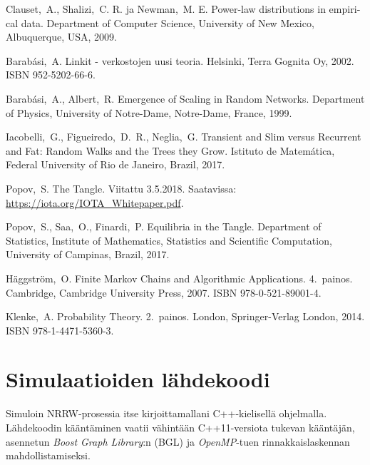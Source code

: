 \documentclass[finnish, 12pt, a4paper, sci, utf8, pdfa]{aaltothesis}
\begin{document}
\thesisbibliography

\begin{thebibliography}{99}

 Clauset,\ A., Shalizi,\ C. R. ja Newman,\ M. E. 
   \foreignlanguage{english}{Power-law distributions in empirical data.} 
   Department of Computer Science, University of New Mexico, Albuquerque, USA, 2009.

 Barabási,\ A. Linkit - verkostojen uusi teoria. 
   Helsinki, Terra Gognita Oy, 2002. ISBN 952-5202-66-6. 

 Barabási,\ A., Albert,\ R.
   \foreignlanguage{english}{Emergence of Scaling in Random Networks.} 
   Department of Physics, University of Notre-Dame, Notre-Dame, France, 1999.

 Iacobelli,\ G., Figueiredo,\ D.\ R., Neglia,\ G. 
   \foreignlanguage{english}{Transient and Slim versus Recurrent and Fat: Random Walks and the Trees they Grow.} 
   Istituto de Matemática, Federal University of Rio de Janeiro, Brazil, 2017.

 Popov,\ S. The Tangle. Viitattu 3.5.2018. Saatavissa: \url{https://iota.org/IOTA_Whitepaper.pdf}.

 Popov,\ S., Saa,\ O., Finardi,\ P. 
   \foreignlanguage{english}{Equilibria in the Tangle.} 
   Department of Statistics, Institute of Mathematics, Statistics and Scientific Computation, University of Campinas, Brazil, 2017.

 Häggström,\ O.
   \foreignlanguage{english}{Finite Markov Chains and Algorithmic Applications.} 
   4.\ painos. Cambridge, Cambridge University Press, 2007. ISBN 978-0-521-89001-4.

 Klenke,\ A.
   \foreignlanguage{english}{Probability Theory.}
   2.\ painos. London, Springer-Verlag London, 2014. ISBN 978-1-4471-5360-3.

\end{thebibliography}

\clearpage

\thesisappendix

\section{Simulaatioiden lähdekoodi\label{LiiteA}}

Simuloin NRRW-prosessia itse kirjoittamallani C++-kielisellä ohjelmalla. Lähdekoodin kääntäminen vaatii vähintään C++11-versiota tukevan kääntäjän, asennetun \textit{Boost Graph Library}:n (BGL) ja \textit{OpenMP}-tuen rinnakkaislaskennan mahdollistamiseksi.
\end{document}
